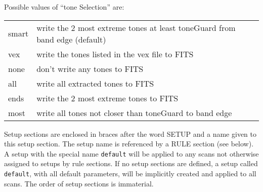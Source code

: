 Possible values of ``tone Selection'' are:
\begin{center}
\begin{tabular}{ll}
smart	& write the 2 most extreme tones at least toneGuard from band edge (default) \\
vex 	& write the tones listed in the vex file to FITS \\
none 	& don't write any tones to FITS \\
all 	& write all extracted tones to FITS \\
ends 	& write the 2 most extreme tones to FITS \\
most 	& write all tones not closer than toneGuard to band edge \\
\end{tabular}
\end{center}

Setup sections are enclosed in braces after the word SETUP and a name given to this setup section.
The setup name is referenced by a RULE section (see below).
A setup with the special name {\tt default} will be applied to any scans not otherwise assigned to setups by rule sections.
If no setup sections are defined, a setup called {\tt default}, with all default parameters, will be implicitly created and applied to all scans.
The order of setup sections is immaterial.

